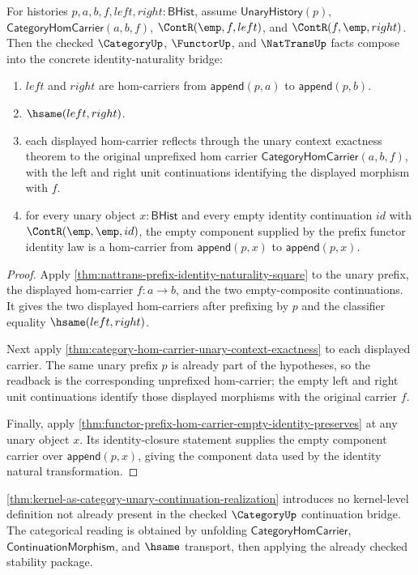 \begin{theorem}
\label{thm:prefix-functor-nattrans-identity-bridge}
For histories $p,a,b,f,left,right:\mathsf{BHist}$, assume
$\mathsf{UnaryHistory}(p)$, $\mathsf{CategoryHomCarrier}(a,b,f)$,
$\ContR(\emp,f,left)$, and $\ContR(f,\emp,right)$. Then the checked
$\CategoryUp$, $\FunctorUp$, and $\NatTransUp$ facts compose into the concrete
identity-naturality bridge:
\begin{enumerate}
\item $left$ and $right$ are hom-carriers from $\mathsf{append}(p,a)$ to
$\mathsf{append}(p,b)$.
\item $\hsame(left,right)$.
\item each displayed hom-carrier reflects through the unary context exactness
theorem to the original unprefixed
hom carrier $\mathsf{CategoryHomCarrier}(a,b,f)$, with the left and right unit
continuations identifying the displayed morphism with $f$.
\item for every unary object $x:\mathsf{BHist}$ and every empty identity
continuation $id$ with $\ContR(\emp,\emp,id)$, the empty component supplied by
the prefix functor identity law is a hom-carrier from
$\mathsf{append}(p,x)$ to $\mathsf{append}(p,x)$.
\end{enumerate}
\end{theorem}

\begin{proof}
Apply \autoref{thm:nattrans-prefix-identity-naturality-square} to the unary
prefix, the displayed hom-carrier $f:a\to b$, and the two empty-composite
continuations. It gives the two displayed hom-carriers after prefixing by $p$
and the classifier equality $\hsame(left,right)$.

Next apply \autoref{thm:category-hom-carrier-unary-context-exactness} to each
displayed carrier. The same unary prefix $p$ is already part of the hypotheses,
so the readback is the corresponding unprefixed hom-carrier; the empty left and
right unit continuations identify those displayed morphisms with the original
carrier $f$.

Finally, apply
\autoref{thm:functor-prefix-hom-carrier-empty-identity-preserves} at any unary object
$x$. Its identity-closure statement supplies the empty component carrier over
$\mathsf{append}(p,x)$, giving the component data used by the identity natural
transformation.
\end{proof}

\begin{remark}
\label{rem:kernel-as-category-no-new-axioms}
\autoref{thm:kernel-as-category-unary-continuation-realization} introduces no
kernel-level definition not already present in the checked $\CategoryUp$
continuation bridge. The categorical reading is obtained by unfolding
$\mathsf{CategoryHomCarrier}$, $\mathsf{ContinuationMorphism}$, and $\hsame$
transport, then applying the already checked stability package.
\end{remark}
